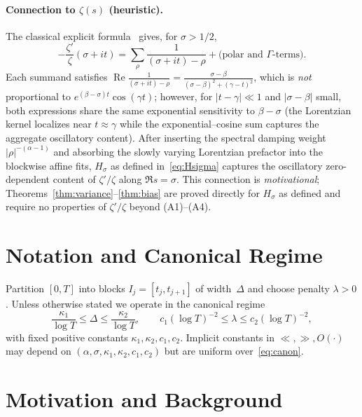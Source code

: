 \paragraph{Connection to $\zeta(s)$ (heuristic).}
The classical explicit formula~\cite{titchmarsh} gives, for $\sigma>1/2$,
\[
-\frac{\zeta'}{\zeta}(\sigma+it)
=\sum_\rho \frac{1}{(\sigma+it)-\rho} + \text{(polar and $\Gamma$-terms)}.
\]
Each summand satisfies
$\operatorname{Re}\frac{1}{(\sigma+it)-\rho}
=\frac{\sigma-\beta}{(\sigma-\beta)^2+(\gamma-t)^2}$,
which is \emph{not} proportional to $e^{(\beta-\sigma)t}\cos(\gamma t)$;
however, for $|t-\gamma|\ll 1$ and $|\sigma-\beta|$ small, both expressions
share the same exponential sensitivity to $\beta-\sigma$ (the Lorentzian
kernel localizes near $t\approx\gamma$ while the exponential--cosine sum
captures the aggregate oscillatory content).
After inserting the spectral damping weight $|\rho|^{-(\alpha-1)}$
and absorbing the slowly varying Lorentzian prefactor into the blockwise
affine fits, $H_\sigma$ as defined in~\eqref{eq:Hsigma} captures the
oscillatory zero-dependent content of $\zeta'/\zeta$ along $\Re s=\sigma$.
This connection is \emph{motivational}; Theorems~\ref{thm:variance}--\ref{thm:bias}
are proved directly for $H_\sigma$ as defined and require no properties
of $\zeta'/\zeta$ beyond (A1)--(A4).

\section{Notation and Canonical Regime}

Partition $[0,T]$ into blocks $I_j=[t_j,t_{j+1}]$ of width~$\Delta$ and choose
penalty $\lambda>0$.  Unless otherwise stated we operate in the canonical regime
\begin{equation}
\frac{\kappa_1}{\log T}\le\Delta\le\frac{\kappa_2}{\log T},
\qquad
c_1(\log T)^{-2}\le\lambda\le c_2(\log T)^{-2},
\label{eq:canon}
\end{equation}
with fixed positive constants $\kappa_1,\kappa_2,c_1,c_2$.
Implicit constants in $\ll,\gg,O(\cdot)$ may depend on
$(\alpha,\sigma,\kappa_1,\kappa_2,c_1,c_2)$ but are uniform over~\eqref{eq:canon}.

\section{Motivation and Background}

